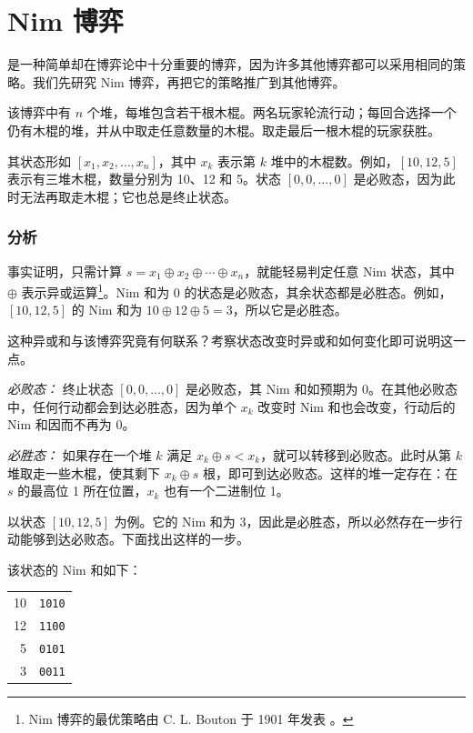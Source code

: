 \section{Nim 博弈}


是一种简单却在博弈论中十分重要的博弈，因为许多其他博弈都可以采用相同的策略。我们先研究 Nim 博弈，再把它的策略推广到其他博弈。

该博弈中有 $n$ 个堆，每堆包含若干根木棍。两名玩家轮流行动；每回合选择一个仍有木棍的堆，并从中取走任意数量的木棍。取走最后一根木棍的玩家获胜。

其状态形如 $[x_1,x_2,\ldots,x_n]$，其中 $x_k$ 表示第 $k$ 堆中的木棍数。例如，$[10,12,5]$ 表示有三堆木棍，数量分别为 10、12 和 5。状态 $[0,0,\ldots,0]$ 是必败态，因为此时无法再取走木棍；它也总是终止状态。

\subsubsection{分析}

事实证明，只需计算 $s = x_1 \oplus x_2 \oplus \cdots \oplus x_n$，就能轻易判定任意 Nim 状态，其中 $\oplus$ 表示异或运算\footnote{Nim 博弈的最优策略由 C. L. Bouton 于 1901 年发表 \cite{bou01}。}。Nim 和为 0 的状态是必败态，其余状态都是必胜态。例如，$[10,12,5]$ 的 Nim 和为 $10 \oplus 12 \oplus 5 = 3$，所以它是必胜态。

这种异或和与该博弈究竟有何联系？考察状态改变时异或和如何变化即可说明这一点。

\textit{必败态：}
终止状态 $[0,0,\ldots,0]$ 是必败态，其 Nim 和如预期为 0。在其他必败态中，任何行动都会到达必胜态，因为单个 $x_k$ 改变时 Nim 和也会改变，行动后的 Nim 和因而不再为 0。

\textit{必胜态：}
如果存在一个堆 $k$ 满足 $x_k \oplus s < x_k$，就可以转移到必败态。此时从第 $k$ 堆取走一些木棍，使其剩下 $x_k \oplus s$ 根，即可到达必败态。这样的堆一定存在：在 $s$ 的最高位 1 所在位置，$x_k$ 也有一个二进制位 1。

以状态 $[10,12,5]$ 为例。它的 Nim 和为 3，因此是必胜态，所以必然存在一步行动能够到达必败态。下面找出这样的一步。

该状态的 Nim 和如下：

\begin{center}
\begin{tabular}{r|r}
10 & \texttt{1010} \\
12 & \texttt{1100} \\
5 & \texttt{0101} \\
\hline
3 & \texttt{0011} \\
\end{tabular}
\end{center}

